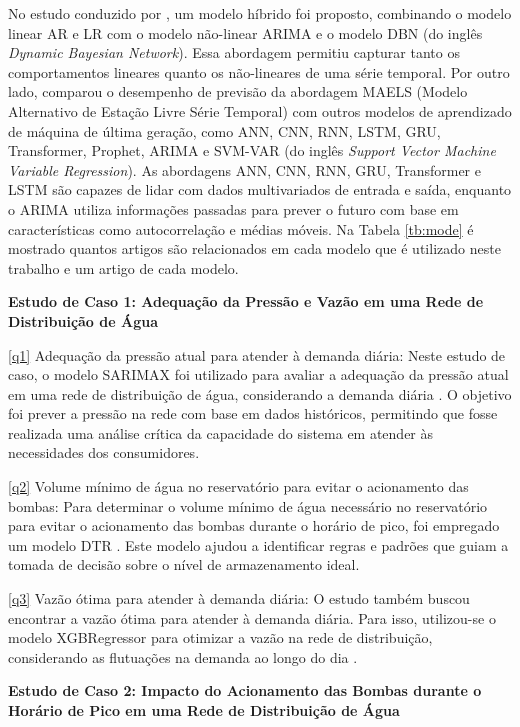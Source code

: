 No estudo conduzido por , um modelo híbrido foi proposto, combinando o modelo linear AR e LR com o modelo não-linear ARIMA e o modelo DBN (do inglês \textit{Dynamic Bayesian Network}). Essa abordagem permitiu capturar tanto os comportamentos lineares quanto os não-lineares de uma série temporal. Por outro lado,  comparou o desempenho de previsão da abordagem MAELS (Modelo Alternativo de Estação Livre Série Temporal) com outros modelos de aprendizado de máquina de última geração, como ANN, CNN, RNN, LSTM, GRU, Transformer, Prophet, ARIMA e SVM-VAR (do inglês \textit{Support Vector Machine Variable Regression}). As abordagens ANN, CNN, RNN, GRU, Transformer e LSTM são capazes de lidar com dados multivariados de entrada e saída, enquanto o ARIMA utiliza informações passadas para prever o futuro com base em características como autocorrelação e médias móveis. Na Tabela \ref{tb:mode} é mostrado quantos artigos são relacionados em cada modelo que é utilizado neste trabalho e um artigo de cada modelo.



\noindent\textbf{Estudo de Caso 1: Adequação da Pressão e Vazão em uma Rede de Distribuição de Água}

\eqref{q1} Adequação da pressão atual para atender à demanda diária: Neste estudo de caso, o modelo SARIMAX foi utilizado para avaliar a adequação da pressão atual em uma rede de distribuição de água, considerando a demanda diária \cite{2-s2.0-85099424908}. O objetivo foi prever a pressão na rede com base em dados históricos, permitindo que fosse realizada uma análise crítica da capacidade do sistema em atender às necessidades dos consumidores.

\eqref{q2} Volume mínimo de água no reservatório para evitar o acionamento das bombas: Para determinar o volume mínimo de água necessário no reservatório para evitar o acionamento das bombas durante o horário de pico, foi empregado um modelo DTR  \cite{2-s2.0-85054695177}. Este modelo ajudou a identificar regras e padrões que guiam a tomada de decisão sobre o nível de armazenamento ideal.

\eqref{q3} Vazão ótima para atender à demanda diária: O estudo também buscou encontrar a vazão ótima para atender à demanda diária. Para isso, utilizou-se o modelo XGBRegressor para otimizar a vazão na rede de distribuição, considerando as flutuações na demanda ao longo do dia \cite{2-s2.0-85130441623}.

\noindent\textbf{Estudo de Caso 2: Impacto do Acionamento das Bombas durante o Horário de Pico em uma Rede de Distribuição de Água}

